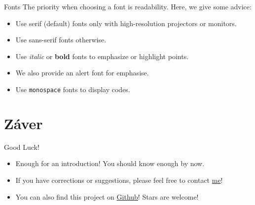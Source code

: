 \documentclass[10pt,aspectratio=169]{beamer}
\begin{document}
	\begin{frame}{Fonts}
		The priority when choosing a font is readability.
		Here, we give some advice:
		\begin{itemize}
			\item Use serif (default) fonts only with high-resolution projectors or monitors.
			\item Use \textsf{sans-serif} fonts otherwise.
			\item Use \textit{italic} or \textbf{bold} fonts to emphasize or highlight points.
			\item We also provide an \alert{alert} font for emphasise.
			\item Use \texttt{monospace} fonts to display codes.
		\end{itemize}
	\end{frame}

	\section{Záver}

	\begin{frame}{Good Luck!}
		\begin{itemize}
			\item Enough for an introduction! You should know enough by now.
			\item If you have corrections or suggestions, please feel free to contact \href{mailto:ruisong20@gmail.com}{me}!
			\item You can also find this project on \href{https://github.com/wurahara/PolyU-Beamer-Slides}{Github}! Stars are welcome!
		\end{itemize}
	\end{frame}

	\backmatter
\end{document}
